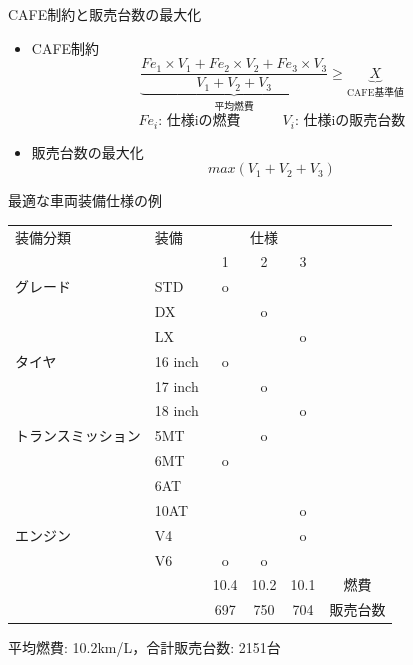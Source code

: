 \documentclass[dvipdfmx, 11pt]{beamer}
\begin{document}
\begin{frame}{CAFE制約と販売台数の最大化}
 \begin{itemize}
 \setlength{\itemsep}{20pt}
 \item CAFE制約
 \[ 
 	\underbrace{
		\frac{Fe_{1} \times V_1 + Fe_{2} \times V_2 + Fe_{3} \times V_3 }{V_1 + V_2 + V_3}
	}_{\mbox{平均燃費}}
	\geq 
	\underbrace{X}_{\mbox{CAFE基準値}}
 \]
 \[
Fe_i \mbox{: 仕様iの燃費}\hspace{3em} V_i\mbox{: 仕様iの販売台数}
\]
 \item 販売台数の最大化
 \[
 	max(V_1+V_2+V_3)
 \]
 \end{itemize}
\end{frame}
\begin{frame}{最適な車両装備仕様の例}
 	\begin{center}
		\scriptsize
		\begin{tabular}{|l|l|c|c|c|c} \cline{1-5}
			装備分類 & 装備 & \multicolumn{3}{c|}{仕様} & \\ \cline{3-5}
					&		& 1&2&3 & \\ \cline{1-5}
			グレード	& STD & o & & & \\ \cline{2-5}
					& DX & & o & & \\ \cline{2-5}
			 		& LX & & & o & \\ \cline{1-5}
			タイヤ 	& 16 inch & o & & & \\ \cline{2-5}
					& 17 inch & & o & & \\ \cline{2-5}
					& 18 inch & & & o & \\ \cline{1-5}
			トランスミッション	& 5MT  & & o & & \\ \cline{2-5}
							& 6MT & o & & & \\ \cline{2-5}
							& 6AT & & & & \\ \cline{2-5}
							& 10AT & & & o & \\ \cline{1-5}
			エンジン 	& V4 & & & o& \\ \cline{2-5}
					& V6 & o & o & & \\ \cline{1-5}

			\multicolumn{2}{l}{} & \multicolumn{1}{c}{10.4} & \multicolumn{1}{c}{10.2} & \multicolumn{1}{c}{10.1} & 燃費\\ 
			\multicolumn{2}{l}{} & \multicolumn{1}{c}{697} & \multicolumn{1}{c}{750} & \multicolumn{1}{c}{704} & 販売台数\\ 
		\end{tabular}
	\end{center}
	\begin{center}
		平均燃費: 10.2km/L，合計販売台数: 2151台
	\end{center}
\end{frame}
\end{document}
